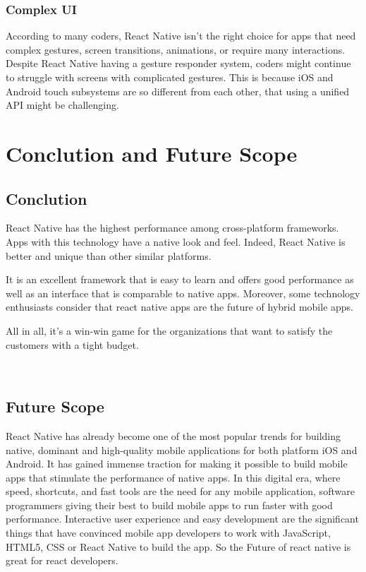 \documentclass[12pt,a4paper]{report}
\begin{document}
\subsection{Complex UI}
According to many coders, React Native isn’t the right choice for apps that need complex gestures, screen transitions, animations, or require many interactions. Despite React Native having a gesture responder system, coders might continue to struggle with screens with complicated gestures. This is because iOS and Android touch subsystems are so different from each other, that using a unified API might be challenging.

\chapter{Conclution and Future Scope}

\section{Conclution}
\begin{FlushLeft}
{\large React Native has the highest performance among cross-platform frameworks. Apps with this technology have a native look and feel. Indeed, React Native is better and unique than other similar platforms.

It is an excellent framework that is easy to learn and offers good performance as well as an interface that is comparable to native apps. Moreover, some technology enthusiasts consider that react native apps are the future of hybrid mobile apps.

All in all, it’s a win-win game for the organizations that want to satisfy the customers with a tight budget.}
\\

\end{FlushLeft}

\section{Future Scope}

\begin{FlushLeft}
{\large React Native has already become one of the most popular trends for building native, dominant and high-quality mobile applications for both platform iOS and Android. It has gained immense traction for making it possible to build mobile apps that stimulate the performance of native apps. In this digital era, where speed, shortcuts, and fast tools are the need for any mobile application, software programmers giving their best to build mobile apps to run faster with good performance. Interactive user experience and easy development are the significant things that have convinced mobile app developers to work with JavaScript, HTML5, CSS or React Native to build the app. So the Future of react native is great for react developers.}
\\
\end{FlushLeft}
\end{document}
